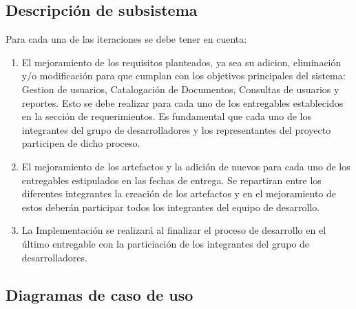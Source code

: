 \documentclass[]{article}
\begin{document}
        \subsection{Descripción de subsistema}
        Para cada una de las iteraciones se debe tener en cuenta:
        \begin{enumerate}
                \item El mejoramiento de los requisitos planteados, ya sea su adicion, eliminación
                y/o modificación para que cumplan con los objetivos principales del sistema:
                Gestion de usuarios, Catalogación de Documentos, Consultas de usuarios y reportes.
                Esto se debe realizar para cada uno de los entregables establecidos en la sección
                de requerimientos. Es fundamental que cada uno de los integrantes del grupo de
                desarrolladores y los representantes del proyecto participen de dicho proceso.
             
                \item El mejoramiento de los artefactos y la adición de nuevos para cada uno de los
                entregables estipulados en las fechas de entrega. Se repartiran entre los
                diferentes integrantes la creación de los artefactos y en el mejoramiento de estos
                deberán participar todos los integrantes del equipo de desarrollo.
                
                \item La Implementación se realizará al finalizar el proceso de desarrollo en el
                último entregable con la particiación de los integrantes del grupo de 
                desarrolladores.
        \end{enumerate}
        
        \subsection{Diagramas de caso de uso}
        
\end{document}
